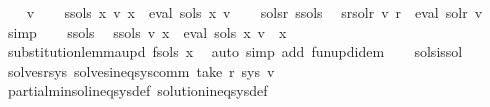 \begin{isabellebody}
\ \ \isamarkupfalse%
\ v\isanewline
\ \ \isamarkupfalse%
\ s{\isacharunderscore}{\kern0pt}sols{\isacharprime}{\kern0pt}{\isacharcolon}{\kern0pt}\ {\isachardoublequoteopen}{\isasymforall}x{\isachardot}{\kern0pt}\ v\ x\ {\isacharequal}{\kern0pt}\ eval\ {\isacharparenleft}{\kern0pt}sols{\isacharprime}{\kern0pt}\ x{\isacharparenright}{\kern0pt}\ v{\isachardoublequoteclose}\isanewline
\ \ \isamarkupfalse%
\ sols{\isacharprime}{\kern0pt}{\isacharunderscore}{\kern0pt}r\ s{\isacharunderscore}{\kern0pt}sols{\isacharprime}{\kern0pt}\ \isamarkupfalse%
\ s{\isacharunderscore}{\kern0pt}r{\isacharunderscore}{\kern0pt}sol{\isacharunderscore}{\kern0pt}r{\isacharcolon}{\kern0pt}\ {\isachardoublequoteopen}v\ r\ {\isacharequal}{\kern0pt}\ eval\ sol{\isacharunderscore}{\kern0pt}r\ v{\isachardoublequoteclose}\ \isamarkupfalse%
\ simp\isanewline
\ \ \isamarkupfalse%
\ s{\isacharunderscore}{\kern0pt}sols{\isacharprime}{\kern0pt}\ \isamarkupfalse%
\ s{\isacharunderscore}{\kern0pt}sols{\isacharcolon}{\kern0pt}\ {\isachardoublequoteopen}v\ x\ {\isacharequal}{\kern0pt}\ eval\ {\isacharparenleft}{\kern0pt}sols\ x{\isacharparenright}{\kern0pt}\ v{\isachardoublequoteclose}\ \ x\isanewline
\ \ \ \ \isamarkupfalse%
\ substitution{\isacharunderscore}{\kern0pt}lemma{\isacharunderscore}{\kern0pt}upd{\isacharbrackleft}{\kern0pt}\ f{\isacharequal}{\kern0pt}{\isachardoublequoteopen}sols\ x{\isachardoublequoteclose}{\isacharbrackright}{\kern0pt}\ \isamarkupfalse%
\ {\isacharparenleft}{\kern0pt}auto\ simp\ add{\isacharcolon}{\kern0pt}\ fun{\isacharunderscore}{\kern0pt}upd{\isacharunderscore}{\kern0pt}idem{\isacharparenright}{\kern0pt}\isanewline
\ \ \isamarkupfalse%
\ sols{\isacharunderscore}{\kern0pt}is{\isacharunderscore}{\kern0pt}sol\ \isamarkupfalse%
\ solves{\isacharunderscore}{\kern0pt}r{\isacharunderscore}{\kern0pt}sys{\isacharcolon}{\kern0pt}\ {\isachardoublequoteopen}solves{\isacharunderscore}{\kern0pt}ineq{\isacharunderscore}{\kern0pt}sys{\isacharunderscore}{\kern0pt}comm\ {\isacharparenleft}{\kern0pt}take\ r\ sys{\isacharparenright}{\kern0pt}\ v{\isachardoublequoteclose}\isanewline
\ \ \ \ \isamarkupfalse%
\ partial{\isacharunderscore}{\kern0pt}min{\isacharunderscore}{\kern0pt}sol{\isacharunderscore}{\kern0pt}ineq{\isacharunderscore}{\kern0pt}sys{\isacharunderscore}{\kern0pt}def\ solution{\isacharunderscore}{\kern0pt}ineq{\isacharunderscore}{\kern0pt}sys{\isacharunderscore}{\kern0pt}def\ \isamarkupfalse%

\end{isabellebody}
